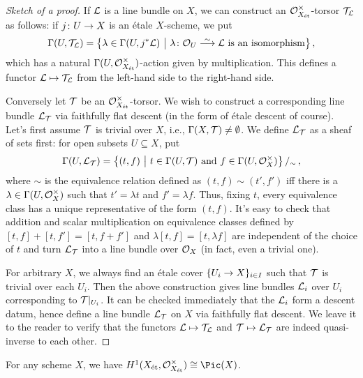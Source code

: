 \begin{proof}[Sketch of a proof]
	If $\mathcal{L}$ is a line bundle on $X$, we can construct an $\mathcal{O}_{X_{\mathrm{\acute{e}t}}}^\times$-torsor $\mathcal{T}_{\mathcal{L}}$ as follows: if $j\colon U\morphism X$ is an étale $X$-scheme, we put
	\begin{equation*}
		\Global(U,\Tt_\Ll)=\big\{\lambda\in \Global(U,j^*\Ll)\ \big|\ \lambda\colon \Oo_U\isomorphism \Ll\text{ is an isomorphism}\big\}\,,
	\end{equation*}
	which has a natural $\operatorname{\Gamma}(U,\mathcal{O}_{X_{\mathrm{\acute{e}t}}}^\times)$-action given by multiplication. This defines a functor $\mathcal{L}\mapsto \mathcal{T}_{\mathcal{L}}$ from the left-hand side to the right-hand side.
	
	Conversely let $\mathcal{T}$ be an $\mathcal{O}_{X_{\mathrm{\acute{e}t}}}^\times$-torsor. We wish to construct a corresponding line bundle $\mathcal{L}_{\mathcal{T}}$ via faithfully flat descent (in the form of étale descent of course). Let's first assume $\mathcal{T}$ is trivial over $X$, i.e., $\operatorname{\Gamma}(X,\mathcal{T})\neq \emptyset$. We define $\mathcal{L}_{\mathcal{T}}$ as a sheaf of sets first: for open subsets $U\subseteq X$, put
	\begin{equation*}
		\operatorname{\Gamma}(U,\mathcal{L}_{\mathcal{T}})=\left\{(t,f)\ \middle|\  t\in \operatorname{\Gamma}(U,\mathcal{T})\text{ and }f\in\operatorname{\Gamma}(U,\mathcal{O}_X^\times)\right\}/_\sim\,,
	\end{equation*}
	where $\sim$ is the equivalence relation defined as $(t,f)\sim (t',f')$ iff there is a $\lambda\in \operatorname{\Gamma}(U,\mathcal{O}_X^\times)$ such that $t'=\lambda t$ and $f'=\lambda f$. Thus, fixing $t$, every equivalence class has a unique representative of the form $(t,f)$. It's easy to check that addition and scalar multiplication on equivalence classes defined by $[t,f]+[t,f']= [t,f+f']$ and $\lambda[t,f]= [t,\lambda f]$ are independent of the choice of $t$ and turn $\mathcal{L}_{\mathcal{T}}$ into a line bundle over $\mathcal{O}_X$ (in fact, even a trivial one).
	
	For arbitrary $X$, we always find an étale cover $\{U_i\morphism X\}_{i\in I}$ such that $\mathcal{T}$ is trivial over each $U_i$. Then the above construction gives line bundles $\mathcal{L}_i$ over $U_i$ corresponding to $\mathcal{T}|_{U_i}$. It can be checked immediately that the $\mathcal{L}_i$ form a descent datum, hence define a line bundle $\mathcal{L}_{\mathcal{T}}$ on $X$ via faithfully flat descent. We leave it to the reader to verify that the functors $\mathcal{L}\mapsto \mathcal{T}_{\mathcal{L}}$ and $\mathcal{T}\mapsto \mathcal{L}_{\mathcal{T}}$ are indeed quasi-inverse to each other.
\end{proof}
\begin{cor}\label{cor:H1Pic}
	For any scheme $X$, we have $H^1(X_\et,\Oo_{X_\et}^\times)\cong \Pic(X)$.
\end{cor}
